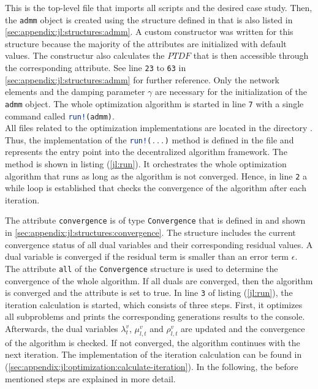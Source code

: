 This is the top-level file that imports all scripts and the desired case study. Then, the \lstinline[language=julia]{admm} object is created using the structure defined in  that is also listed in \ref{sec:appendix:jl:structures:admm}. A custom constructor was written for this structure because the majority of the attributes are initialized with default values. The constructur also calculates the $PTDF$ that is then accessible through the corresponding attribute. See line \texttt{23} to \texttt{63} in \ref{sec:appendix:jl:structures:admm} for further reference. Only the network elements and the damping parameter $\gamma$ are necessary for the initialization of the \lstinline[language=julia]{admm} object. The whole optimization algorithm is started  in line \texttt{7} with a single command called \lstinline[language=julia]{run!(admm)}.\\

All files related to the optimization implementations are located in the directory . Thus, the implementation of the \lstinline[language=julia]{run!(...)} method is defined in the file  and represents the entry point into the decentralized algorithm framework. The method is shown in listing (\ref{jl:run}). It orchestrates the whole optimization algorithm that runs as long as the algorithm is not converged. Hence, in line \texttt{2} a while loop is established that checks the convergence of the algorithm after each iteration.



The attribute \lstinline[language=julia]{convergence} is of type \lstinline[language=julia]{Convergence} that is defined in  and shown in \ref{sec:appendix:jl:structures:convergence}. The structure includes the current convergence status of all dual variables and their corresponding residual values. A dual variable is converged if the residual term is smaller than an error term $\epsilon$. The attribute \lstinline[language=julia]{all} of the \lstinline[language=julia]{Convergence} structure is used to determine the convergence of the whole algorithm. If all duals are converged, then the algorithm is converged and the attribute is set to true. In line \texttt{3} of listing (\ref{jl:run}), the iteration calculation is started, which consists of three steps. First, it optimizes all subproblems and prints the corresponding generations results to the console. Afterwards, the dual variables $\lambda_{t}^v$, $\mu_{l,t}^v$ and $\rho_{l,t}^v$ are updated and the convergence of the algorithm is checked. If not converged, the algorithm continues with the next iteration. The implementation of the iteration calculation can be found in (\ref{sec:appendix:jl:optimization:calculate-iteration}). In the following, the before mentioned steps are explained in more detail.

